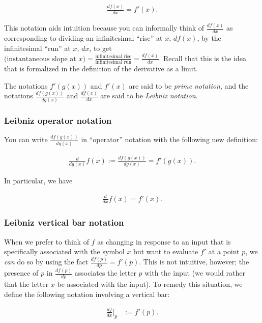 \begin{align*}
    \frac{df(x)}{dx} = f'(x).
\end{align*}

This notation aids intuition because you can informally think of $\frac{df(x)}{dx}$ as corresponding to dividing an infinitesimal ``rise'' at $x$, $df(x)$, by the infinitesimal ``run'' at $x$, $dx$, to get $(\text{instantaneous slope at $x$)} = \frac{\text{infinitesimal rise}}{\text{infinitesimal run}} = \frac{df(x)}{dx}$. Recall that this is the idea that is formalized in the definition of the derivative as a limit.

The notations $f'(g(x))$ and $f'(x)$ are said to be \textit{prime notation}, and the notations $\frac{df(g(x))}{dg(x)}$ and $\frac{df(x)}{dx}$ are said to be \textit{Leibniz notation}.

\subsubsection*{Leibniz operator notation}
         
You can write $\frac{df(g(x))}{dg(x)}$ in ``operator'' notation with the following new definition:

\begin{align*}
    \frac{d}{dg(x)}f(x) := \frac{df(g(x))}{dg(x)} = f'(g(x)).
\end{align*}

In particular, we have

\begin{align*}
    \frac{d}{dx}f(x) = f'(x).
\end{align*}

\subsubsection*{Leibniz vertical bar notation}

When we prefer to think of $f$ as changing in response to an input that is specifically associated with the symbol $x$ but want to evaluate $f'$ at a point $p$, we \textit{can} do so by using the fact $\frac{df(p)}{dp} = f'(p)$. This is not intuitive, however; the presence of $p$ in $\frac{df(p)}{dp}$ associates the letter $p$ with the input (we would rather that the letter $x$ be associated with the input). To remedy this situation, we define the following notation involving a vertical bar:

\begin{align*}
    \frac{df}{dx}\Big|_p &:= f'(p).
\end{align*}

